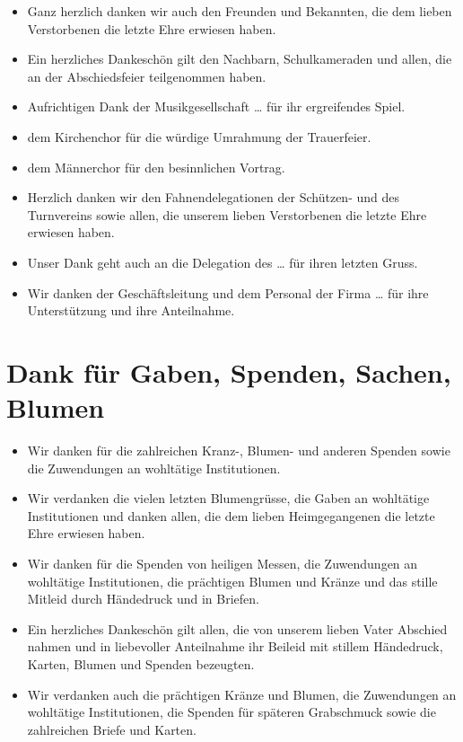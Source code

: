 \documentclass[ngerman,a4paper,11pt]{scrreprt}
\begin{document}
\begin{itemize}
\item Ganz herzlich danken wir auch den Freunden und Bekannten, die dem lieben
Verstorbenen die letzte Ehre erwiesen haben.
\item Ein herzliches Dankeschön gilt den Nachbarn, Schulkameraden und allen, die
an der Abschiedsfeier teilgenommen haben.
\item Aufrichtigen Dank der Musikgesellschaft \ldots{} für ihr ergreifendes Spiel.
\item dem Kirchenchor für die würdige Umrahmung der Trauerfeier.
\item dem Männerchor für den besinnlichen Vortrag.
\item Herzlich danken wir den Fahnendelegationen der Schützen- und des
Turnvereins sowie allen, die unserem lieben Verstorbenen die letzte Ehre
erwiesen haben.
\item Unser Dank geht auch an die Delegation des \ldots{} für ihren letzten Gruss.
\item Wir danken der Geschäftsleitung und dem Personal der Firma \ldots{} für ihre
Unterstützung und ihre Anteilnahme.
\end{itemize}

\section{Dank für Gaben, Spenden, Sachen, Blumen}
\label{sec-2-1-8}

\begin{itemize}
\item Wir danken für die zahlreichen Kranz-, Blumen- und anderen Spenden sowie
die Zuwendungen an wohltätige Institutionen.
\item Wir verdanken die vielen letzten Blumengrüsse, die Gaben an wohltätige
Institutionen und danken allen, die dem lieben Heimgegangenen die letzte
Ehre erwiesen haben.
\item Wir danken für die Spenden von heiligen Messen, die Zuwendungen an
wohltätige Institutionen, die prächtigen Blumen und Kränze und das stille
Mitleid durch Händedruck und in Briefen.
\item Ein herzliches Dankeschön gilt allen, die von unserem lieben Vater
Abschied nahmen und in liebevoller Anteilnahme ihr Beileid mit stillem
Händedruck, Karten, Blumen und Spenden bezeugten.
\item Wir verdanken auch die prächtigen Kränze und Blumen, die Zuwendungen an
wohltätige Institutionen, die Spenden für späteren Grabschmuck sowie die
zahlreichen Briefe und Karten.
\end{itemize}
\end{document}
